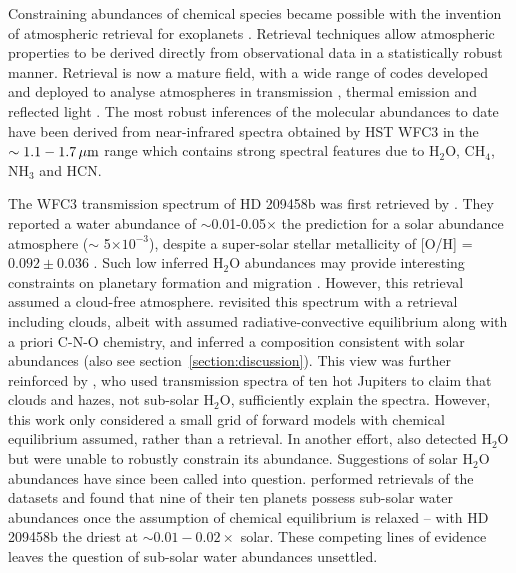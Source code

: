 \documentclass[fleqn,usenatbib]{mnras}
\begin{document}
Constraining abundances of chemical species became possible with the invention of atmospheric retrieval for exoplanets \citep{Madhusudhan2009,Madhusudhan2011}. Retrieval techniques allow atmospheric properties to be derived directly from observational data in a statistically robust manner. Retrieval is now a mature field, with a wide range of codes developed and deployed to analyse atmospheres in transmission \citep{Benneke2012,Benneke2013,Benneke2015, Waldmann2015a, Line2016a}, thermal emission \citep{Lee2012,Barstow2013,Line2013,Line2016b,Waldmann2015b} and reflected light \citep{Lee2013,Lupu2016a,Lavie2016}. The most robust inferences of the molecular abundances to date have been derived from near-infrared spectra obtained by HST WFC3 in the $\sim 1.1-1.7 \, \hbox{$\mu$m}$ range which contains strong spectral features due to $\mathrm{H_2 O}$, $\mathrm{CH_4}$, $\mathrm{NH_3}$ and $\mathrm{HCN}$.

The WFC3 transmission spectrum of HD 209458b \citep{Deming2013} was first retrieved by \citet{Madhusudhan2014c}. They reported a water abundance of $\sim$0.01-0.05$\times$ the prediction for a solar abundance atmosphere ($\sim$ 5$\times 10^{-3}$), despite a super-solar stellar metallicity of [O/H] = $0.092 \pm 0.036$ \citep{Brewer2016}. Such low inferred $\mathrm{H_2 O}$ abundances may provide interesting constraints on planetary formation and migration \citep{Madhusudhan2014b}. However, this retrieval assumed a cloud-free atmosphere. \citet{Benneke2015} revisited this spectrum with a retrieval including clouds, albeit with assumed radiative-convective equilibrium along with a priori C-N-O chemistry, and inferred a composition consistent with solar abundances (also see section~\ref{section:discussion}). This view was further reinforced by \citet{Sing2016}, who used transmission spectra of ten hot Jupiters to claim that clouds and hazes, not sub-solar H$_2$O, sufficiently explain the spectra. However, this work only considered a small grid of forward models with chemical equilibrium assumed, rather than a retrieval. In another effort, \citet{Tsiaras2016a} also detected H$_2$O but were unable to robustly constrain its abundance. Suggestions of solar $\mathrm{H_2 O}$ abundances have since been called into question. \citet{Barstow2016} performed retrievals of the \citet{Sing2016} datasets and found that nine of their ten planets possess sub-solar water abundances once the assumption of chemical equilibrium is relaxed -- with HD 209458b the driest at $\sim 0.01-0.02 \times$ solar. These competing lines of evidence leaves the question of sub-solar water abundances unsettled.
\end{document}
